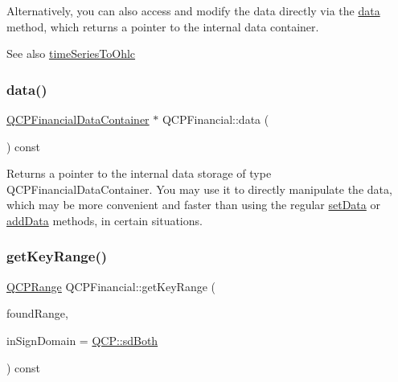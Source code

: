 Alternatively, you can also access and modify the data directly via the \hyperlink{classQCPFinancial_aec3f666271cf48bd7b87d84fe3f8c074}{data} method, which returns a pointer to the internal data container.

\begin{DoxySeeAlso}{See also}
\hyperlink{classQCPFinancial_a9a058c035040d3939b8884f4aaccb1a7}{time\+Series\+To\+Ohlc} 
\end{DoxySeeAlso}
\mbox{\label{classQCPFinancial_aec3f666271cf48bd7b87d84fe3f8c074}} 
\subsubsection{\texorpdfstring{data()}{data()}}
{\footnotesize\ttfamily \hyperlink{classQCPDataContainer}{Q\+C\+P\+Financial\+Data\+Container} $\ast$ Q\+C\+P\+Financial\+::data (\begin{DoxyParamCaption}{ }\end{DoxyParamCaption}) const\hspace{0.3cm}{\ttfamily [inline]}}

Returns a pointer to the internal data storage of type Q\+C\+P\+Financial\+Data\+Container. You may use it to directly manipulate the data, which may be more convenient and faster than using the regular \hyperlink{classQCPFinancial_a72089e75b8a50d18097526c3c79fdb85}{set\+Data} or \hyperlink{classQCPFinancial_a372ac031e44a7a6c912d203556af96f7}{add\+Data} methods, in certain situations. \mbox{\label{classQCPFinancial_a15d68fb257113fef697356d65fa76559}} 
\subsubsection{\texorpdfstring{get\+Key\+Range()}{getKeyRange()}}
{\footnotesize\ttfamily \hyperlink{classQCPRange}{Q\+C\+P\+Range} Q\+C\+P\+Financial\+::get\+Key\+Range (\begin{DoxyParamCaption}\item[{bool \&}]{found\+Range,  }\item[{\hyperlink{namespaceQCP_afd50e7cf431af385614987d8553ff8a9}{Q\+C\+P\+::\+Sign\+Domain}}]{in\+Sign\+Domain = {\ttfamily \hyperlink{namespaceQCP_afd50e7cf431af385614987d8553ff8a9aa38352ef02d51ddfa4399d9551566e24}{Q\+C\+P\+::sd\+Both}} }\end{DoxyParamCaption}) const\hspace{0.3cm}{\ttfamily [virtual]}}

